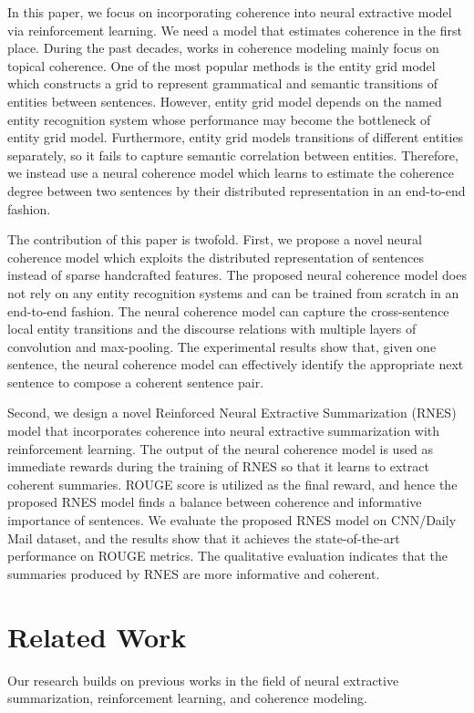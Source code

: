 \documentclass[letterpaper]{article} \usepackage{aaai18}  \usepackage{times}  \usepackage{helvet}  \usepackage{courier}  \usepackage{url}  \usepackage{graphicx}  \usepackage{amssymb}
\begin{document}
	In this paper, we focus on incorporating coherence into neural extractive model via reinforcement learning. We need a model that estimates coherence in the first place. During the past decades, works in coherence modeling mainly focus on topical coherence. One of the most popular methods is the entity grid model~\cite{entitygrid} which constructs a grid to represent grammatical and semantic transitions of entities between sentences. However, entity grid model depends on the named entity recognition system whose performance may become the bottleneck of entity grid model. Furthermore, entity grid models transitions of different entities separately, so it fails to capture semantic correlation between entities. Therefore, we instead use a neural coherence model which learns to estimate the coherence degree between two sentences by their distributed representation in an end-to-end fashion. 
	






	The contribution of this paper is twofold. First, we propose a novel neural coherence model which exploits the distributed representation of sentences instead of sparse handcrafted features. The proposed neural coherence model does not rely on any entity recognition systems and can be trained from scratch in an end-to-end fashion. The neural coherence model can capture the cross-sentence local entity transitions and the discourse relations with multiple layers of convolution and max-pooling. The experimental results show that, given one sentence, the neural coherence model can effectively identify the appropriate next sentence to compose a coherent sentence pair.
	
	Second, we design a novel Reinforced Neural Extractive Summarization (RNES) model that incorporates coherence into neural extractive summarization with reinforcement learning. The output of the neural coherence model is used as immediate rewards during the training of RNES so that it learns to extract coherent summaries. ROUGE score is utilized as the final reward, and hence the proposed RNES model finds a balance between coherence and informative importance of sentences. We evaluate the proposed RNES model on CNN/Daily Mail dataset, and the results show that it achieves the state-of-the-art performance on ROUGE metrics. The qualitative evaluation indicates that the summaries produced by RNES are more informative and coherent.
	
	
	\section{Related Work}
	Our research builds on previous works in the field of neural extractive summarization, reinforcement learning, and coherence modeling.
	
\end{document}
